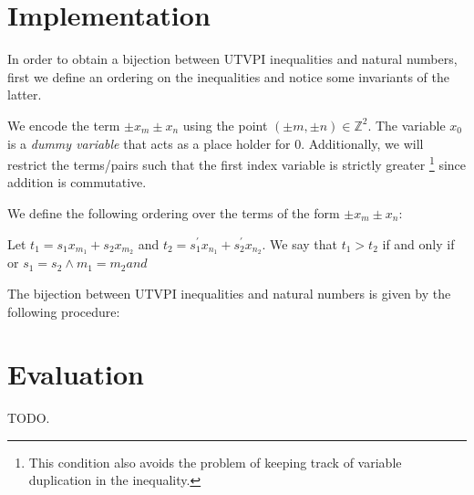%

\section{Implementation}

In order to obtain a bijection between UTVPI inequalities and
natural numbers, first we define an ordering on the inequalities
and notice some invariants of the latter. 

We encode the term $\pm x_m \pm x_n$ using the point
$(\pm m, \pm n) \in \mathbb{Z}^2$. The variable $x_0$ is a
\emph{dummy variable} that acts as a place holder for 0. 
Additionally, we will restrict the terms/pairs such that the first
index variable is strictly greater \footnote{This condition also
  avoids the problem of keeping track of variable duplication in 
the inequality.} since addition is commutative.

We define the following ordering over the terms of the form
$\pm x_m \pm x_n$:

\begin{definition} Let $t_1 = s_1 x_{m_1} + s_2 x_{m_2}$ and
  $t_2 = s_1^{'} x_{n_1} + s_2^{'} x_{n_2}$. We say that 
  $t_1 > t_2$ if and only if or $s_1 = s_2 \land m_1 = m_2 and $
\end{definition}




The bijection between UTVPI inequalities and natural numbers
is given by the following procedure:

\section{Evaluation}
TODO.

